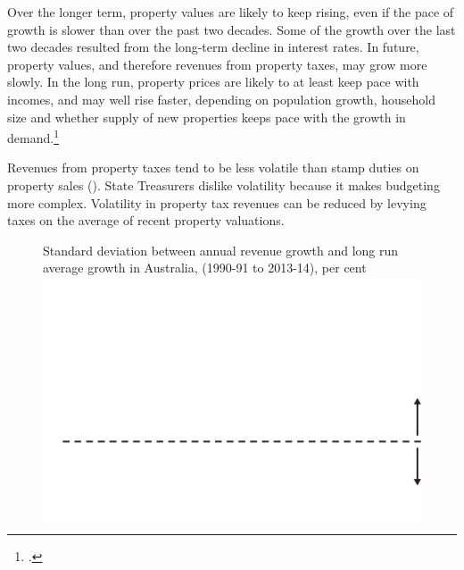 Over the longer term, property values are likely to keep rising, even if the pace of growth is slower than over the past two decades. Some of the growth over the last two decades resulted from the long-term decline in interest rates. In future, property values, and therefore revenues from property taxes, may grow more slowly.  In the long run, property prices are likely to at least keep pace with incomes, and may well rise faster, depending on population growth, household size and whether supply of new properties keeps pace with the growth in demand.\footcite[][6--7]{RBA2014SubmissionAffordableHousingInquiry}  

Revenues from property taxes tend to be less volatile than stamp duties on property sales (). State Treasurers dislike volatility because it makes budgeting more complex. Volatility in property tax revenues can be reduced by levying taxes on the average of recent property valuations. 

\begin{figure}
%
{Standard deviation between annual revenue growth and long run average growth in Australia, (1990-91 to 2013-14), per cent}
\includegraphics[width=\columnwidth]{Property-taxes/atlas/figure/Figure4-1.pdf}

\end{figure}

